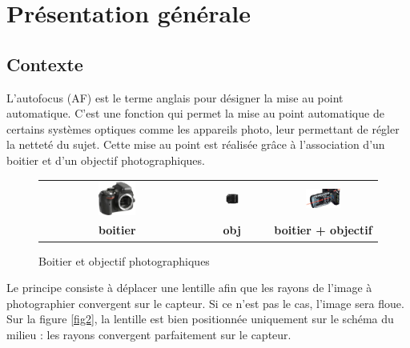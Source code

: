 
\section{Présentation générale}

\subsection{Contexte}\label{contexte}


L'autofocus (AF) est le terme anglais pour désigner la mise au point automatique. C'est une fonction qui permet la mise au point automatique 
de certains systèmes optiques comme les appareils photo, leur permettant de régler la netteté du sujet. Cette mise au point est réalisée grâce à
l'association d'un boitier et d'un objectif photographiques.

\begin{figure}[!htb]
\begin{center}
\begin{tabular}{ccc}
\includegraphics[width=0.25\textwidth]{images/image6.jpeg}
&
\includegraphics[width=0.21\textwidth]{images/image7.png}
&
\includegraphics[width=0.35\textwidth]{images/image8.png}
\\
\textbf{boitier}& \textbf{obj}& \textbf{boitier + objectif}
\end{tabular}
\caption{Boitier et objectif photographiques \label{fig1}}
\end{center}
\end{figure}
\vspace{-.5cm}


Le principe consiste à déplacer une lentille afin que les rayons de l'image à photographier convergent sur le capteur. Si ce n'est pas le
cas, l'image sera floue. Sur la figure \ref{fig2}, la lentille est bien positionnée uniquement sur le schéma du milieu :
les rayons convergent parfaitement sur le capteur.


